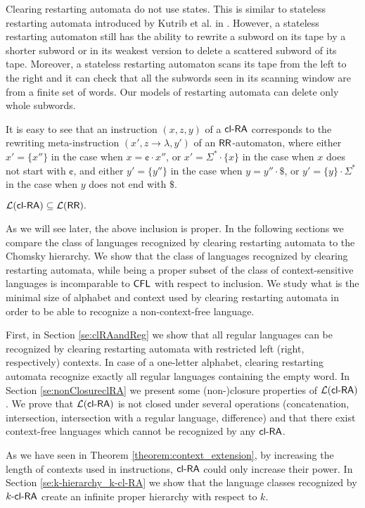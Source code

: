 Clearing restarting automata do not use states. This is similar to stateless restarting automata introduced by Kutrib et al. in \cite{KuMeOt08}. However, a stateless restarting automaton still has the ability to rewrite a subword on its tape by a shorter subword or in its weakest version to delete a scattered subword of its tape. Moreover, a stateless restarting automaton scans its tape from the left to the right and it can check that all the subwords seen in its scanning window are from a finite set of words. Our models of restarting automata can delete only whole subwords.

It is easy to see that an instruction $(x,z,y)$ of a $\clRA$ corresponds to the rewriting meta-instruction $(x',z \to \lambda,y')$ of an $\RR$-automaton, where either $x'=\{x''\}$ in the case when $x=\cent \cdot x''$, or $x' = \Sigma^*\cdot \{x\}$ in the case when $x$ does not start with $\cent$, and either $y'=\{y''\}$ in the case when $y=y'' \cdot \$ $, or $y' = \{y\} \cdot \Sigma^* $ in the case when $y$ does not end with $\$ $.

\begin{theorem}\label{theorem:clRAsubseteqRR}
$\calL{\clRA} \subseteq \calL{\RR}.$
\end{theorem}

As we will see later, the above inclusion is proper. In the following sections we compare the class of languages recognized by clearing restarting automata to the Chomsky hierarchy. We show that the class of languages recognized by clearing restarting automata, while being a proper subset of the class of context-sensitive languages is incomparable to $\CFL$ with respect to inclusion. We study what is the minimal size of alphabet and context used by clearing restarting automata in order to be able to recognize a non-context-free language.

First, in Section \ref{se:clRAandReg} we show that all regular languages can be recognized by clearing restarting automata with restricted left (right, respectively) contexts. In case of a one-letter alphabet, clearing restarting automata recognize exactly all regular languages containing the empty word. In Section \ref{se:nonClosureclRA} we present some (non-)closure properties of $\calL{\clRA}$. We prove that $\calL{\clRA}$ is not closed under several operations (concatenation, intersection, intersection with a regular language, difference) and that there exist context-free languages which cannot be recognized by any $\clRA$.

As we have seen in Theorem \ref{theorem:context_extension}, by increasing the length of contexts used in instructions, $\clRA$ could only increase their power. In Section \ref{se:k-hierarchy_k-cl-RA} we show that the language classes recognized by $\kclRA[k]$ create an infinite proper hierarchy with respect to $k$.

